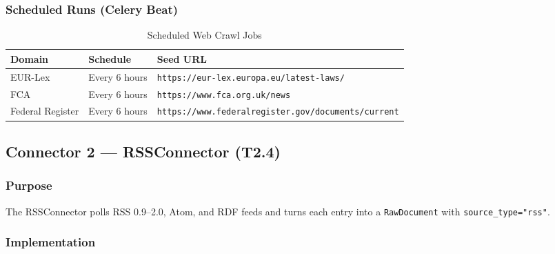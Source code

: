 \documentclass[12pt,a4paper]{article}
\begin{document}
\subsubsection{Scheduled Runs (Celery Beat)}

\begin{table}[H]
\centering
\caption{Scheduled Web Crawl Jobs}\label{tab:webschedule}
\begin{tabularx}{\textwidth}{@{}l l X@{}}
\toprule
\textbf{Domain} & \textbf{Schedule} & \textbf{Seed URL} \\
\midrule
EUR-Lex         & Every 6 hours & \texttt{https://eur-lex.europa.eu/latest-laws/} \\
FCA             & Every 6 hours & \texttt{https://www.fca.org.uk/news} \\
Federal Register& Every 6 hours & \texttt{https://www.federalregister.gov/documents/current} \\
\bottomrule
\end{tabularx}
\end{table}

\subsection{Connector 2 — RSSConnector (T2.4)}

\subsubsection{Purpose}

The RSSConnector polls RSS 0.9--2.0, Atom, and RDF feeds and turns each entry into a \texttt{RawDocument} with \texttt{source\_type="rss"}.

\subsubsection{Implementation}
\end{document}
